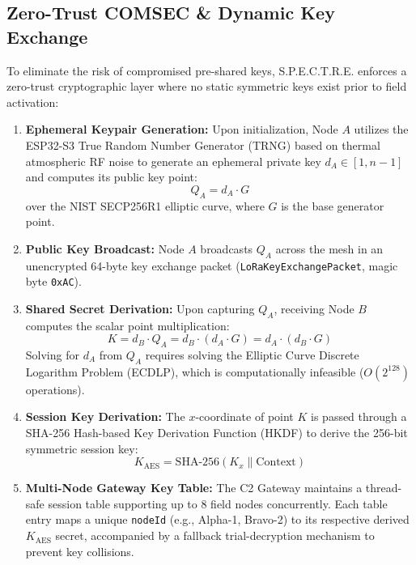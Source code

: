 \documentclass[conference]{IEEEtran}
\begin{document}
\subsection{Zero-Trust COMSEC \& Dynamic Key Exchange}
To eliminate the risk of compromised pre-shared keys, S.P.E.C.T.R.E. enforces a zero-trust cryptographic layer where no static symmetric keys exist prior to field activation:
\begin{enumerate}
    \item \textbf{Ephemeral Keypair Generation:} Upon initialization, Node $A$ utilizes the ESP32-S3 True Random Number Generator (TRNG) based on thermal atmospheric RF noise to generate an ephemeral private key $d_A \in [1, n-1]$ and computes its public key point:
    \begin{equation}
    Q_A = d_A \cdot G
    \end{equation}
    over the NIST SECP256R1 elliptic curve, where $G$ is the base generator point.
    \item \textbf{Public Key Broadcast:} Node $A$ broadcasts $Q_A$ across the mesh in an unencrypted 64-byte key exchange packet (\texttt{LoRaKeyExchangePacket}, magic byte \texttt{0xAC}).
    \item \textbf{Shared Secret Derivation:} Upon capturing $Q_A$, receiving Node $B$ computes the scalar point multiplication:
    \begin{equation}
    K = d_B \cdot Q_A = d_B \cdot (d_A \cdot G) = d_A \cdot (d_B \cdot G)
    \end{equation}
    Solving for $d_A$ from $Q_A$ requires solving the Elliptic Curve Discrete Logarithm Problem (ECDLP), which is computationally infeasible ($O(2^{128})$ operations).
    \item \textbf{Session Key Derivation:} The $x$-coordinate of point $K$ is passed through a SHA-256 Hash-based Key Derivation Function (HKDF) to derive the 256-bit symmetric session key:
    \begin{equation}
    K_{\text{AES}} = \text{SHA-256}(K_x \parallel \text{Context})
    \end{equation}
    \item \textbf{Multi-Node Gateway Key Table:} The C2 Gateway maintains a thread-safe session table supporting up to 8 field nodes concurrently. Each table entry maps a unique \texttt{nodeId} (e.g., Alpha-1, Bravo-2) to its respective derived $K_{\text{AES}}$ secret, accompanied by a fallback trial-decryption mechanism to prevent key collisions.
\end{enumerate}
\end{document}
